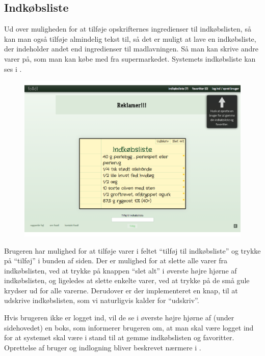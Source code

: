 \subsection{Indkøbsliste}
\label{subsec:brug-indkoebsliste}

Ud over muligheden for at tilføje opskrifternes ingredienser til indkøbslisten, så kan man også tilføje almindelig tekst til, så det er muligt at lave en indkøbsliste, der indeholder andet end ingredienser til madlavningen. Så man kan skrive andre varer på, som man kan købe med fra \fx supermarkedet. Systemets indkøbsliste kan ses i .

\begin{figure}[H]
	\centering
	\includegraphics[scale=0.3]{billeder/foodl/thumbnails/indkoebsliste.png}
	\label{fig:overblik-indkoebsliste}
\end{figure}

Brugeren har mulighed for at tilføje varer i feltet ``tilføj til indkøbsliste'' og trykke på ``tilføj'' i bunden af siden. Der er mulighed for at slette alle varer fra indkøbslisten, ved at trykke på knappen ``slet alt'' i øverste højre hjørne af indkøbslisten, og ligeledes at slette enkelte varer, ved at trykke på de små gule krydser ud for alle varerne. Derudover er der implementeret en knap, til at udskrive indkøbslisten, som vi naturligvis kalder for ``udskriv''.

Hvis brugeren ikke er logget ind, vil de se i øverste højre hjørne af  (under sidehovedet) en boks, som informerer brugeren om, at man skal være logget ind for at systemet skal være i stand til at gemme indkøbslisten og favoritter. Oprettelse af bruger og indlogning bliver beskrevet nærmere i .
